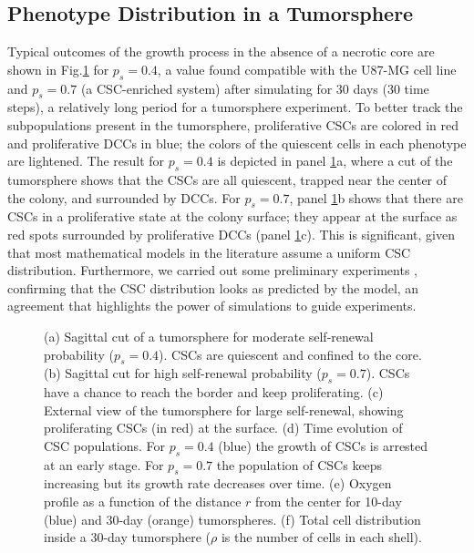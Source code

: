\documentclass[10pt,letterpaper]{article}
\begin{document}
\subsection*{Phenotype Distribution in a Tumorsphere}

Typical outcomes of the growth process in the absence of a necrotic core are shown in Fig.\ref{f:methods} for $p_s = 0.4$, a value found compatible with the U87-MG cell line \cite{gao2013} and $p_s = 0.7$ (a CSC-enriched system) after simulating for 30 days (30 time steps), a relatively long period for a tumorsphere experiment. To better track the subpopulations present in the tumorsphere, proliferative CSCs are colored in  red and proliferative DCCs in blue; the colors of the quiescent cells in each phenotype are lightened. The result for $p_s = 0.4$ is depicted in panel \ref{f:methods}a, where a cut of the tumorsphere shows that the CSCs are all quiescent, trapped near the center of the colony, and surrounded by DCCs. For $p_s = 0.7$, panel \ref{f:methods}b shows that there are CSCs in a proliferative state at the colony surface; they appear at the surface as red spots surrounded by proliferative DCCs (panel \ref{f:methods}c). This is significant, given that most mathematical models in the literature assume a uniform CSC distribution. Furthermore, we carried out some preliminary experiments \cite{fotinos2024}, confirming that the CSC distribution looks as predicted by the model, an agreement that highlights the power of simulations to guide experiments.

\begin{figure}
	\centering
	\caption{(a) Sagittal cut of a tumorsphere for moderate self-renewal probability ($p_s=0.4$). CSCs are quiescent and confined to the core.  (b) Sagittal cut for high self-renewal probability ($p_s=0.7$). CSCs have a chance to reach the border and keep proliferating. (c) External view of the tumorsphere for large self-renewal, showing  proliferating CSCs (in red) at the surface. (d) Time evolution of CSC populations. For $p_s=0.4$ (blue) the growth of CSCs is arrested at an early stage. For $p_s=0.7$ the population of CSCs keeps increasing but its growth rate decreases over time.  (e) Oxygen profile as a function of the distance $r$ from the center for 10-day (blue) and 30-day (orange) tumorspheres.   (f) Total cell distribution inside a 30-day tumorsphere ($\rho$ is the number of cells in each shell).  \label{f:methods}} 	
\end{figure}
\end{document}
